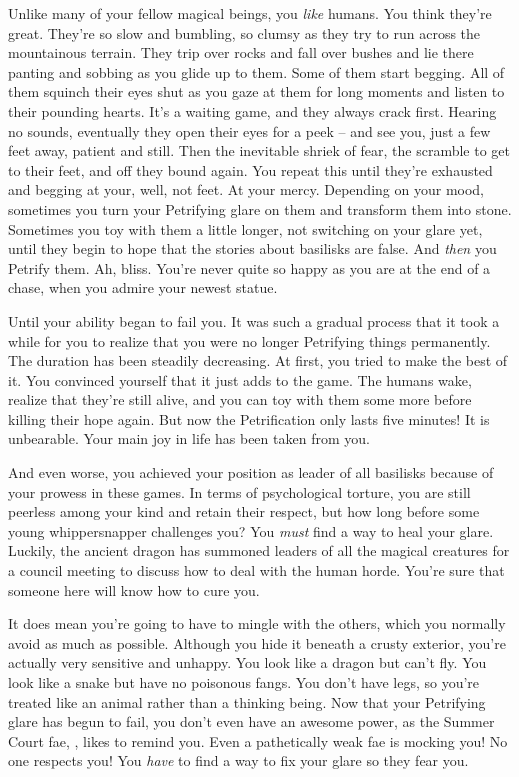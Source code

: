 \documentclass[char]{guildcamp2}
\begin{document}
\name{\cBasilisk{}}

Unlike many of your fellow magical beings, you \emph{like} humans.  You think they're great.  They're so slow and bumbling, so clumsy as they try to run across the mountainous terrain.  They trip over rocks and fall over bushes and lie there panting and sobbing as you glide up to them.  Some of them start begging.  All of them squinch their eyes shut as you gaze at them for long moments and listen to their pounding hearts.  It's a waiting game, and they always crack first.  Hearing no sounds, eventually they open their eyes for a peek -- and see you, just a few feet away, patient and still.  Then the inevitable shriek of fear, the scramble to get to their feet, and off they bound again.  You repeat this until they're exhausted and begging at your, well, not feet.  At your mercy.  Depending on your mood, sometimes you turn your Petrifying glare on them and transform them into stone.  Sometimes you toy with them a little longer, not switching on your glare yet, until they begin to hope that the stories about basilisks are false.  And \emph{then} you Petrify them.  Ah, bliss.  You're never quite so happy as you are at the end of a chase, when you admire your newest statue.

Until your ability began to fail you.  It was such a gradual process that it took a while for you to realize that you were no longer Petrifying things permanently.  The duration has been steadily decreasing.  At first, you tried to make the best of it.  You convinced yourself that it just adds to the game.  The humans wake, realize that they're still alive, and you can toy with them some more before killing their hope again.  But now the Petrification only lasts five minutes!  It is unbearable.  Your main joy in life has been taken from you.  

And even worse, you achieved your position as leader of all basilisks because of your prowess in these games.  In terms of psychological torture, you are still peerless among your kind and retain their respect, but how long before some young whippersnapper challenges you?  You \emph{must} find a way to heal your glare.  Luckily, the ancient dragon \cOnyx{\intro} has summoned leaders of all the magical creatures for a council meeting to discuss how to deal with the human horde.  You're sure that someone here will know how to cure you.

It does mean you're going to have to mingle with the others, which you normally avoid as much as possible.  Although you hide it beneath a crusty exterior, you're actually very sensitive and unhappy.  You look like a dragon but can't fly.  You look like a snake but have no poisonous fangs.  You don't have legs, so you're treated like an animal rather than a thinking being.  Now that your Petrifying glare has begun to fail, you don't even have an awesome power, as the Summer Court fae, \cTreeFae{\intro}, likes to remind you.  Even a pathetically weak fae is mocking you!  No one respects you!  You \emph{have} to find a way to fix your glare so they fear you.
\end{document}
